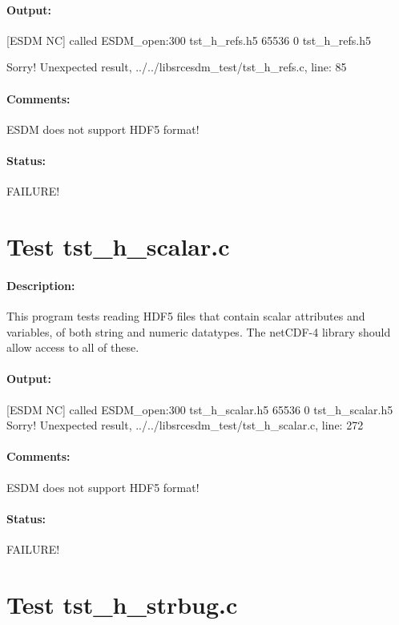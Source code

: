\paragraph{Output:} [ESDM NC] called ESDM\_open:300 tst\_h\_refs.h5 65536 0 tst\_h\_refs.h5

Sorry! Unexpected result, ../../libsrcesdm\_test/tst\_h\_refs.c, line: 85

\paragraph{Comments:} ESDM does not support HDF5 format!

\paragraph{Status:} FAILURE!

\section{Test tst\_h\_scalar.c}

\paragraph{Description:} This program tests reading HDF5 files that contain scalar attributes and variables, of both string and numeric datatypes.  The netCDF-4 library should allow access to all of these.

\paragraph{Output:} [ESDM NC] called ESDM\_open:300 tst\_h\_scalar.h5 65536 0 tst\_h\_scalar.h5
Sorry! Unexpected result, ../../libsrcesdm\_test/tst\_h\_scalar.c, line: 272

\paragraph{Comments:} ESDM does not support HDF5 format!

\paragraph{Status:} FAILURE!

\section{Test tst\_h\_strbug.c}

